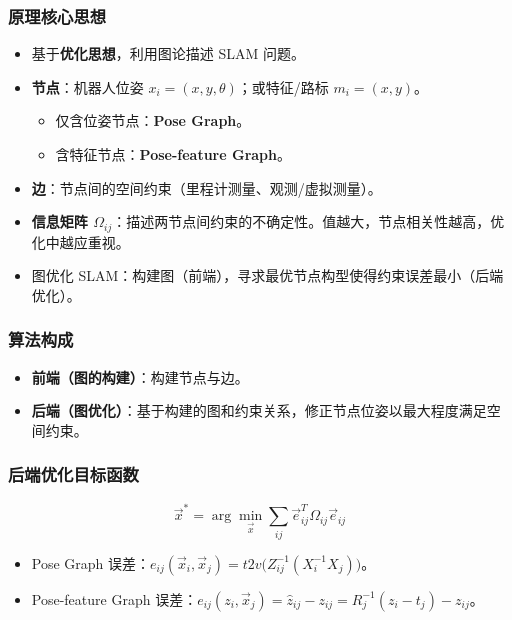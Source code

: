 \documentclass[11pt,a4paper]{article}
\begin{document}
\subsubsection*{原理核心思想}
\begin{keypoint}
\begin{itemize}
  \item 基于\textbf{优化思想}，利用图论描述 SLAM 问题。
  \item \textbf{节点}：机器人位姿 $x_i=(x,y,\theta)$；或特征/路标 $m_i=(x,y)$。
    \begin{itemize}
      \item 仅含位姿节点：\textbf{Pose Graph}。
      \item 含特征节点：\textbf{Pose-feature Graph}。
    \end{itemize}
  \item \textbf{边}：节点间的空间约束（里程计测量、观测/虚拟测量）。
  \item \textbf{信息矩阵 $\Omega_{ij}$}：描述两节点间约束的不确定性。值越大，节点相关性越高，优化中越应重视。
  \item 图优化 SLAM：构建图（前端），寻求最优节点构型使得约束误差最小（后端优化）。
\end{itemize}
\end{keypoint}

\subsubsection*{算法构成}
\begin{itemize}
  \item \textbf{前端（图的构建）}：构建节点与边。
  \item \textbf{后端（图优化）}：基于构建的图和约束关系，修正节点位姿以最大程度满足空间约束。
\end{itemize}

\subsubsection*{后端优化目标函数}
\[
\vec{x}^*=\arg\min_{\vec{x}}\sum_{ij}\vec{e}_{ij}^T\Omega_{ij}\vec{e}_{ij}
\]
\begin{itemize}
  \item Pose Graph 误差：$e_{ij}(\vec{x}_i,\vec{x}_j)=t2v\bigl(Z_{ij}^{-1}(X_i^{-1}X_j)\bigr)$。
  \item Pose-feature Graph 误差：$e_{ij}(z_i,\vec{x}_j)=\hat{z}_{ij}-z_{ij}=R_j^{-1}(z_i-t_j)-z_{ij}$。
\end{itemize}
\end{document}
